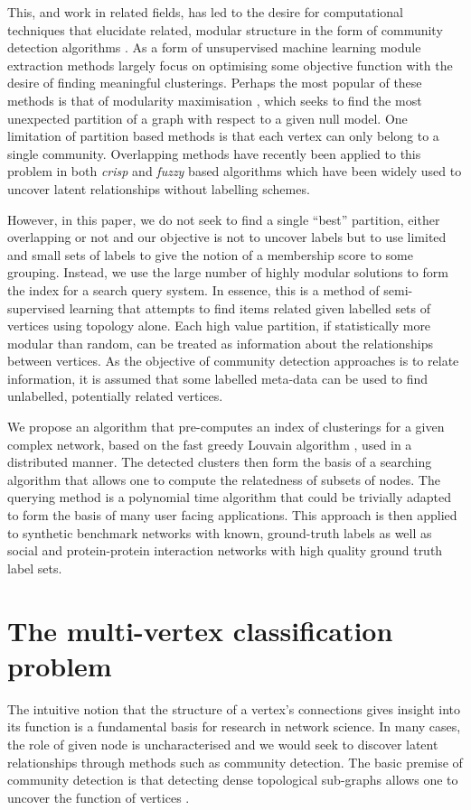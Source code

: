 \documentclass[sigconf]{acmart}
\begin{document}
This, and work in related fields, has led to the desire for computational techniques that elucidate related, modular structure in the form of community detection algorithms \cite{fortunato2010community}.
As a form of unsupervised machine learning module extraction methods largely focus on optimising some objective function with the desire of finding meaningful clusterings.
Perhaps the most popular of these methods is that of modularity maximisation \cite{newman2004}, which seeks to find the most unexpected partition of a graph with respect to a given null model.
One limitation of partition based methods is that each vertex can only belong to a single community.
Overlapping methods have recently been applied to this problem in both \textit{crisp} \cite{ahn2010link, lancichinetti2011finding} and \textit{fuzzy} \cite{gregory2011fuzzy} based algorithms which have been widely used to uncover latent relationships without labelling schemes.

However, in this paper, we do not seek to find a single ``best'' partition, either overlapping or not and our objective is not to uncover labels but to use limited and small sets of labels to give the notion of a membership score to some grouping.
Instead, we use the large number of highly modular solutions to form the index for a search query system.
In essence, this is a method of semi-supervised learning that attempts to find items related given labelled sets of vertices using topology alone.
Each high value partition, if statistically more modular than random, can be treated as information about the relationships between vertices.
As the objective of community detection approaches is to relate information, it is assumed that some labelled meta-data can be used to find unlabelled, potentially related vertices.

We propose an algorithm that pre-computes an index of clusterings for a given complex network, based on the fast greedy Louvain algorithm \cite{blondel2008fast}, used in a distributed manner.
The detected clusters then form the basis of a searching algorithm that allows one to compute the relatedness of subsets of nodes.
The querying method is a polynomial time algorithm that could be trivially adapted to form the basis of many user facing applications.
This approach is then applied to synthetic benchmark networks with known, ground-truth labels as well as social and protein-protein interaction networks with high quality ground truth label sets.

\section{The multi-vertex classification problem}
The intuitive notion that the structure of a vertex's connections gives insight into its function is a fundamental basis for research in network science.
In many cases, the role of given node is uncharacterised and we would seek to discover latent relationships through methods such as community detection.
The basic premise of community detection is that detecting dense topological sub-graphs allows one to uncover the function of vertices \cite{fortunato2010community}.
\end{document}
